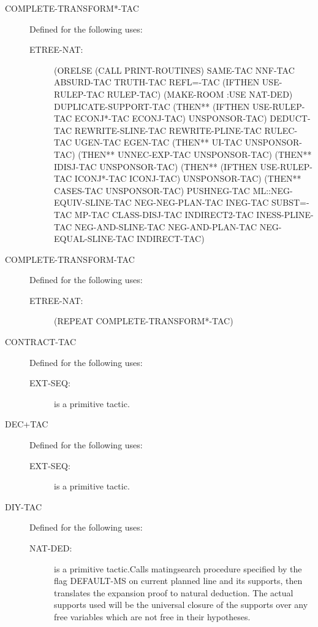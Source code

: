 \begin{description}
\begin{description}
\end{description}

\item[COMPLETE-TRANSFORM*-TAC]  Defined for the following uses:
\begin{description}
\item[ETREE-NAT:] 
(ORELSE (CALL PRINT-ROUTINES) SAME-TAC NNF-TAC ABSURD-TAC TRUTH-TAC
 REFL=-TAC (IFTHEN USE-RULEP-TAC RULEP-TAC) (MAKE-ROOM :USE NAT-DED)
 DUPLICATE-SUPPORT-TAC
 (THEN** (IFTHEN USE-RULEP-TAC ECONJ*-TAC ECONJ-TAC) UNSPONSOR-TAC)
 DEDUCT-TAC REWRITE-SLINE-TAC REWRITE-PLINE-TAC RULEC-TAC UGEN-TAC
 EGEN-TAC (THEN** UI-TAC UNSPONSOR-TAC)
 (THEN** UNNEC-EXP-TAC UNSPONSOR-TAC) (THEN** IDISJ-TAC UNSPONSOR-TAC)
 (THEN** (IFTHEN USE-RULEP-TAC ICONJ*-TAC ICONJ-TAC) UNSPONSOR-TAC)
 (THEN** CASES-TAC UNSPONSOR-TAC) PUSHNEG-TAC ML::NEG-EQUIV-SLINE-TAC
 NEG-NEG-PLAN-TAC INEG-TAC SUBST=-TAC MP-TAC CLASS-DISJ-TAC
 INDIRECT2-TAC INESS-PLINE-TAC NEG-AND-SLINE-TAC NEG-AND-PLAN-TAC
 NEG-EQUAL-SLINE-TAC INDIRECT-TAC)


\end{description}

\item[COMPLETE-TRANSFORM-TAC]  Defined for the following uses:
\begin{description}
\item[ETREE-NAT:] 
(REPEAT COMPLETE-TRANSFORM*-TAC)


\end{description}

\item[CONTRACT-TAC]  Defined for the following uses:
\begin{description}
\item[EXT-SEQ:]  is a primitive tactic.

\end{description}

\item[DEC+TAC]  Defined for the following uses:
\begin{description}
\item[EXT-SEQ:]  is a primitive tactic.

\end{description}

\item[DIY-TAC]  Defined for the following uses:
\begin{description}
\item[NAT-DED:]  is a primitive tactic.Calls matingsearch procedure specified by the flag DEFAULT-MS on current
planned line and its supports, then translates the expansion proof to 
natural deduction.  The actual supports used will be the universal closure 
of the supports over any free variables which are not free in their 
hypotheses.


\end{description}
\end{description}
